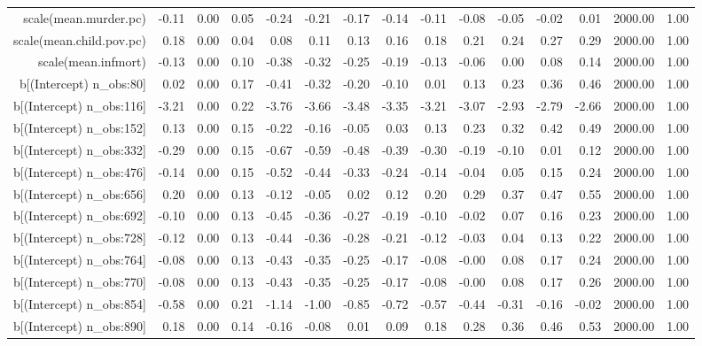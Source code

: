 \begin{table}[ht]
\begin{tabular}{rrrrrrrrrrrrrrr}
  scale(mean.murder.pc) & -0.11 & 0.00 & 0.05 & -0.24 & -0.21 & -0.17 & -0.14 & -0.11 & -0.08 & -0.05 & -0.02 & 0.01 & 2000.00 & 1.00 \\ 
  scale(mean.child.pov.pc) & 0.18 & 0.00 & 0.04 & 0.08 & 0.11 & 0.13 & 0.16 & 0.18 & 0.21 & 0.24 & 0.27 & 0.29 & 2000.00 & 1.00 \\ 
  scale(mean.infmort) & -0.13 & 0.00 & 0.10 & -0.38 & -0.32 & -0.25 & -0.19 & -0.13 & -0.06 & 0.00 & 0.08 & 0.14 & 2000.00 & 1.00 \\ 
  b[(Intercept) n\_obs:80] & 0.02 & 0.00 & 0.17 & -0.41 & -0.32 & -0.20 & -0.10 & 0.01 & 0.13 & 0.23 & 0.36 & 0.46 & 2000.00 & 1.00 \\ 
  b[(Intercept) n\_obs:116] & -3.21 & 0.00 & 0.22 & -3.76 & -3.66 & -3.48 & -3.35 & -3.21 & -3.07 & -2.93 & -2.79 & -2.66 & 2000.00 & 1.00 \\ 
  b[(Intercept) n\_obs:152] & 0.13 & 0.00 & 0.15 & -0.22 & -0.16 & -0.05 & 0.03 & 0.13 & 0.23 & 0.32 & 0.42 & 0.49 & 2000.00 & 1.00 \\ 
  b[(Intercept) n\_obs:332] & -0.29 & 0.00 & 0.15 & -0.67 & -0.59 & -0.48 & -0.39 & -0.30 & -0.19 & -0.10 & 0.01 & 0.12 & 2000.00 & 1.00 \\ 
  b[(Intercept) n\_obs:476] & -0.14 & 0.00 & 0.15 & -0.52 & -0.44 & -0.33 & -0.24 & -0.14 & -0.04 & 0.05 & 0.15 & 0.24 & 2000.00 & 1.00 \\ 
  b[(Intercept) n\_obs:656] & 0.20 & 0.00 & 0.13 & -0.12 & -0.05 & 0.02 & 0.12 & 0.20 & 0.29 & 0.37 & 0.47 & 0.55 & 2000.00 & 1.00 \\ 
  b[(Intercept) n\_obs:692] & -0.10 & 0.00 & 0.13 & -0.45 & -0.36 & -0.27 & -0.19 & -0.10 & -0.02 & 0.07 & 0.16 & 0.23 & 2000.00 & 1.00 \\ 
  b[(Intercept) n\_obs:728] & -0.12 & 0.00 & 0.13 & -0.44 & -0.36 & -0.28 & -0.21 & -0.12 & -0.03 & 0.04 & 0.13 & 0.22 & 2000.00 & 1.00 \\ 
  b[(Intercept) n\_obs:764] & -0.08 & 0.00 & 0.13 & -0.43 & -0.35 & -0.25 & -0.17 & -0.08 & -0.00 & 0.08 & 0.17 & 0.24 & 2000.00 & 1.00 \\ 
  b[(Intercept) n\_obs:770] & -0.08 & 0.00 & 0.13 & -0.43 & -0.35 & -0.25 & -0.17 & -0.08 & -0.00 & 0.08 & 0.17 & 0.26 & 2000.00 & 1.00 \\ 
  b[(Intercept) n\_obs:854] & -0.58 & 0.00 & 0.21 & -1.14 & -1.00 & -0.85 & -0.72 & -0.57 & -0.44 & -0.31 & -0.16 & -0.02 & 2000.00 & 1.00 \\ 
  b[(Intercept) n\_obs:890] & 0.18 & 0.00 & 0.14 & -0.16 & -0.08 & 0.01 & 0.09 & 0.18 & 0.28 & 0.36 & 0.46 & 0.53 & 2000.00 & 1.00 \\ 

\end{tabular}
\end{table}
